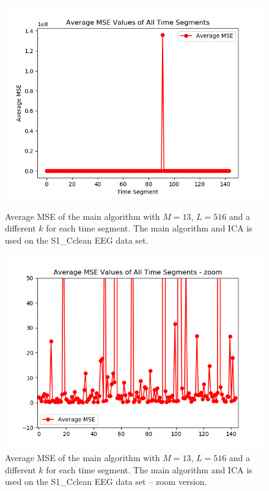 \begin{figure}[H]
    \begin{minipage}[t]{.45\textwidth}
		\centering
		\includegraphics[scale=0.5]{figures/ch_7/AveMSE_2M_N.png}
	\caption{Average MSE of the main algorithm with $M=13$, $L = 516$ and a different $k$ for each time segment. The main algorithm and ICA is used on the S1\_Cclean EEG data set.}
	\label{fig:M<<N_1}
    \end{minipage} 
    \hfill
    \begin{minipage}[t]{.45\textwidth}
        \centering
		\includegraphics[scale=0.5]{figures/ch_7/AveMSE_2M_N_zoom.png}
	\caption{Average MSE of the main algorithm with $M=13$, $L = 516$ and a different $k$ for each time segment. The main algorithm and ICA is used on the S1\_Cclean EEG data set -- zoom version.}
	\label{fig:M<<N_1_2}
    \end{minipage}
\end{figure}
\noindent

